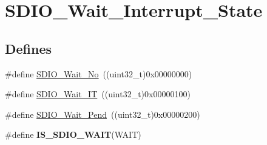 \hypertarget{group__SDIO__Wait__Interrupt__State}{
\section{SDIO\_\-Wait\_\-Interrupt\_\-State}
\label{group__SDIO__Wait__Interrupt__State}
}
\subsection*{Defines}
\begin{DoxyCompactItemize}
\item 
\#define \hyperlink{group__SDIO__Wait__Interrupt__State_ga266294e1ffd7a4b45e62bff753ca44b2}{SDIO\_\-Wait\_\-No}~((uint32\_\-t)0x00000000)
\item 
\#define \hyperlink{group__SDIO__Wait__Interrupt__State_ga3914bbe26a656c8e151272ccdc12c71c}{SDIO\_\-Wait\_\-IT}~((uint32\_\-t)0x00000100)
\item 
\#define \hyperlink{group__SDIO__Wait__Interrupt__State_ga2a4104023a7f8403ddd159ec3bbb8592}{SDIO\_\-Wait\_\-Pend}~((uint32\_\-t)0x00000200)
\item 
\#define {\bfseries IS\_\-SDIO\_\-WAIT}(WAIT)
\end{DoxyCompactItemize}


